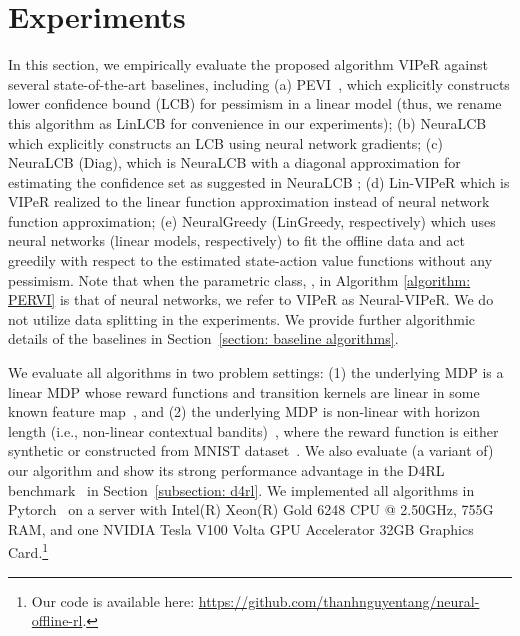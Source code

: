\documentclass{article} \usepackage{iclr2023/iclr2023_conference,times}
\begin{document}
\section{Experiments}
In this section, we empirically evaluate the proposed algorithm VIPeR against several state-of-the-art baselines, including (a) PEVI~\citep{jin2021pessimism}, which explicitly constructs lower confidence bound (LCB) for pessimism in a linear model (thus, we rename this algorithm as LinLCB for convenience in our experiments); (b) NeuraLCB~\citep{nguyen2021offline} which explicitly constructs an LCB using neural network gradients; (c) NeuraLCB (Diag), which is NeuraLCB with a diagonal approximation for estimating the confidence set as suggested in NeuraLCB \citep{nguyen2021offline}; (d) Lin-VIPeR which is VIPeR realized to the linear function approximation instead of neural network function approximation; (e) NeuralGreedy (LinGreedy, respectively) which uses neural networks (linear models, respectively) to fit the offline data and act greedily with respect to the estimated state-action value functions without any pessimism. Note that when the parametric class, , in Algorithm \ref{algorithm: PERVI} is that of neural networks, we refer to VIPeR as Neural-VIPeR. We do not utilize data splitting in the experiments. We provide further algorithmic details of the baselines in Section~\ref{section: baseline algorithms}. 


We evaluate all algorithms in two problem settings: (1) the underlying MDP is a linear MDP whose reward functions and transition kernels are linear in some known feature map~\citep{jin2020provably}, and (2) the underlying MDP is non-linear with horizon length  (i.e., non-linear contextual bandits)~\citep{zhou2020neural}, where the reward function is either synthetic or constructed from MNIST dataset~\citep{lecun1998gradient}. We also evaluate (a variant of) our algorithm and show its strong performance advantage in the D4RL benchmark~\citep{DBLP:journals/corr/abs-2004-07219} in Section~\ref{subsection: d4rl}. We implemented all algorithms in Pytorch~\citep{paszke2019pytorch} on a server with Intel(R) Xeon(R) Gold 6248 CPU @ 2.50GHz, 755G RAM, and one NVIDIA Tesla V100 Volta GPU Accelerator 32GB Graphics Card.\footnote{Our code is available here: \url{https://github.com/thanhnguyentang/neural-offline-rl}.}
\end{document}
